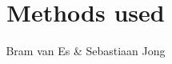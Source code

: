\documentclass[a4paper,10pt]{article}
\title{Methods used}
\author{Bram van Es \& Sebastiaan Jong}
\begin{document}
\maketitle

\begin{abstract}

\end{abstract}

\section{}
\end{document}
